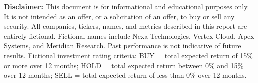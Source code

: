 \documentclass[10pt,titlepage]{article}
\begin{document}
\vspace{3pt}
\noindent
\textbf{Disclaimer:} This document is for informational and educational purposes only. It is not intended as an offer, or a solicitation of an offer, to buy or sell any security. All companies, tickers, names, and metrics described in this report are entirely fictional. Fictional names include Nexa Technologies, Vertex Cloud, Apex Systems, and Meridian Research. Past performance is not indicative of future results. Fictional investment rating criteria: BUY = total expected return of 15\% or more over 12 months; HOLD = total expected return between 0\% and 15\% over 12 months; SELL = total expected return of less than 0\% over 12 months.
\end{document}
